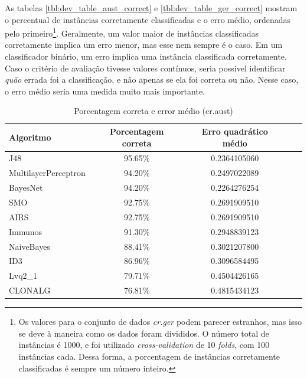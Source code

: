 As tabelas \ref{tbl:dev_table_aust_correct} e \ref{tbl:dev_table_ger_correct} mostram o percentual de instâncias corretamente classificadas e o erro médio, ordenadas pelo primeiro\footnote{Os valores para o conjunto de dados \emph{cr.ger} podem parecer estranhos, mas isso se deve à maneira como os dados foram divididos. O número total de instâncias é 1000, e foi utilizado \emph{cross-validation} de 10 \emph{folds}, com 100 instâncias cada. Dessa forma, a porcentagem de instâncias corretamente classificadas é sempre um número inteiro.}. Geralmente, um valor maior de instâncias classificadas corretamente implica um erro menor, mas esse nem sempre é o caso. Em um classificador binário, um erro implica uma instância classificada corretamente. Caso o critério de avaliação tivesse valores contínuos, seria possível identificar \emph{quão} errada foi a classificação, e não apenas se ela foi correta ou não. Nesse caso, o erro médio seria uma medida muito mais importante.

\vspace{0.5cm}
\begin{table}[h!]
    \centering
    \caption{Porcentagem correta e error médio (cr.aust)}
    \label{tbl:dev_table_aust_correct}
    \label{tbl:dev_table_first}
    \vspace{0.5cm}
    \begin{tabular}{|l|c|c|c|c|}
        \hline
        \textbf{Algoritmo} & \textbf{Porcentagem correta} & \textbf{Erro quadrático médio} \\
        \hline
        \rowcolor[gray]{.9}
        J48                  & 95.65\% & 0.2364105060 \\ \hline
        \rowcolor[gray]{.9}
        MultilayerPerceptron & 94.20\% & 0.2497022089 \\ \hline
        \rowcolor[gray]{.9}
        BayesNet             & 94.20\% & 0.2264276254 \\ \hline
        SMO                  & 92.75\% & 0.2691909510 \\ \hline
        AIRS                 & 92.75\% & 0.2691909510 \\ \hline
        Immunos              & 91.30\% & 0.2948839123 \\ \hline
        NaiveBayes           & 88.41\% & 0.3021207800 \\ \hline
        ID3                  & 86.96\% & 0.3096584495 \\ \hline
        Lvq2\_1              & 79.71\% & 0.4504426165 \\ \hline
        CLONALG              & 76.81\% & 0.4815434123 \\ \hline
    \end{tabular}
\end{table}
\vspace{0.5cm}

